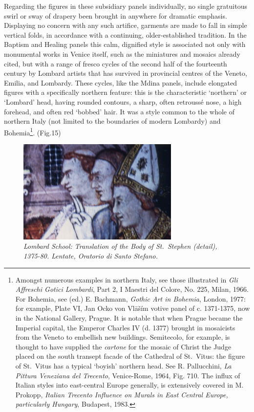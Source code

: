 \documentclass[a4paper,12pt]{article}
\begin{document}
Regarding the figures in these subsidiary panels individually, no
single gratuitous swirl or sway of drapery been brought in anywhere
for dramatic emphasis. Displaying no concern with any such artifice,
garments are made to fall in simple vertical folds, in accordance with
a continuing, older-established tradition. In the Baptism and Healing
panels this calm, dignified style is associated not only with
monumental works in Venice itself, such as the miniatures and mosaics
already cited, but with a range of fresco cycles of the second half of
the fourteenth century by Lombard artists that has survived in
provincial centres of the Veneto, Emilia, and Lombardy.  These cycles,
like the Mdina panels, include elongated figures with a specifically
northern feature: this is the characteristic `northern' or `Lombard'
head, having rounded contours, a sharp, often retrouss\'e nose, a high
forehead, and often red `bobbed' hair. It was a style common to the
whole of northern Italy (not limited to the boundaries of modern
Lombardy) and Bohemia\footnote{Amongst numerous examples in northern
Italy, see those illustrated in \textit{Gli Affreschi Gotici
Lombardi}, Part 2, I Maestri del Colore, No. 225, Milan, 1966.  For
Bohemia, see (ed.) E. Bachmann, \textit{Gothic Art in Bohemia},
London, 1977: for example, Plate VI, Jan Ocko von Vl\={a}\v{s}\'{i}m votive
panel of c. 1371-1375, now in the National Gallery, Prague. It is
notable that when Prague became the Imperial capital, the Emperor
Charles IV (d. 1377) brought in mosaicists from the Veneto to
embellish new buildings. Semitecolo, for example, is thought to have
supplied the \textit{cartone} for the mosaic of Christ the Judge
placed on the south transept facade of the Cathedral of St.~Vitus: the
figure of St.~Vitus has a typical `boyish' northern head. See
R. Pallucchini, \textit{La Pittura Veneziana del Trecento},
Venice-Rome, 1964, Fig. 710.  The influx of Italian styles into
east-central Europe generally, is extensively covered in M. Prokopp,
\textit{Italian Trecento Influence on Murals in East Central Europe,
particularly Hungary}, Budapest, 1983.}. (Fig.15) 
\begin{figure}[htbp]
\centering
\includegraphics[width=8cm]{pics/fig15.png}
\caption[Lombard School: Translation of the Body of St.~Stephen,
  1375-80]
{\it Lombard School: Translation of the Body of St.~Stephen (detail), 1375-80.
Lentate, Oratorio di Santo Stefano.} 
\end{figure}
\end{document}
